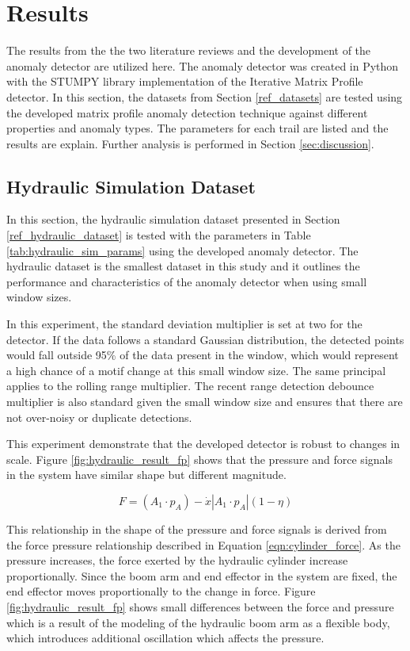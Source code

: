 \section{Results}
\label{ref_results}

The results from the the two literature reviews and the development of the anomaly detector are utilized here. The anomaly detector was created in Python with the STUMPY library implementation of the Iterative Matrix Profile detector. In this section, the datasets from Section \ref{ref_datasets} are tested using the developed matrix profile anomaly detection technique against different properties and anomaly types. The parameters for each trail are listed and the results are explain. Further analysis is performed in Section \ref{sec:discussion}.

\subsection{Hydraulic Simulation Dataset}
\label{ref_results_hydraulic_sim}
In this section, the hydraulic simulation dataset presented in Section \ref{ref_hydraulic_dataset} is tested  with the parameters in Table \ref{tab:hydraulic_sim_params} using the developed anomaly detector. The hydraulic dataset is the smallest dataset in this study and it outlines the performance and characteristics of the anomaly detector when using small window sizes.

In this experiment, the standard deviation multiplier is set at two for the detector. If the data follows a standard Gaussian distribution, the detected points would fall outside 95\% of the data present in the window, which would represent a high chance of a motif change at this small window size. The same principal applies to the rolling range multiplier. The recent range detection debounce multiplier is also standard given the small window size and ensures that there are not over-noisy or duplicate detections.

This experiment demonstrate that the developed detector is robust to changes in scale. Figure \ref{fig:hydraulic_result_fp} shows that the pressure and force signals in the system have similar shape but different magnitude. 

\begin{equation}
    \label{eqn:cylinder_force}
    F = (A_1 \cdot p_A) - \dot{x}  | A_1 \cdot p_A | (1 - \eta)
\end{equation}

This relationship in the shape of the pressure and force signals is derived from the force pressure relationship described in Equation \ref{eqn:cylinder_force}. As the pressure increases, the force exerted by the hydraulic cylinder increase proportionally. Since the boom arm and end effector in the system are fixed, the end effector moves proportionally to the change in force. Figure \ref{fig:hydraulic_result_fp} shows small differences between the force and pressure which is a result of the modeling of the hydraulic boom arm as a flexible body, which introduces additional oscillation which affects the pressure.


